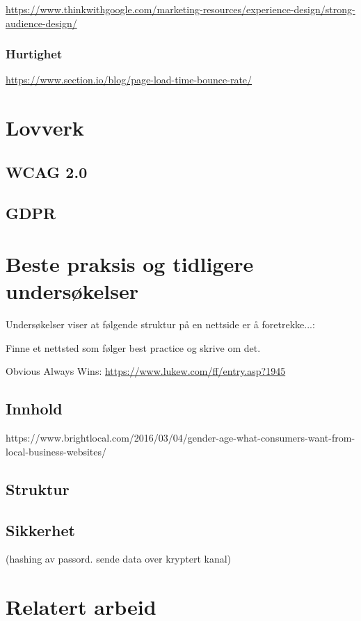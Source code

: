 \url{https://www.thinkwithgoogle.com/marketing-resources/experience-design/strong-audience-design/}

\subsubsection{Hurtighet}
\url{https://www.section.io/blog/page-load-time-bounce-rate/ }


\section{Lovverk}
\subsection{WCAG 2.0}
\subsection{GDPR}



\section{Beste praksis og tidligere undersøkelser}
Undersøkelser viser at følgende struktur på en nettside er å foretrekke...:

Finne et nettsted som følger best practice og skrive om det.

Obvious Always Wins:
\url{https://www.lukew.com/ff/entry.asp?1945}

\subsection{Innhold}
https://www.brightlocal.com/2016/03/04/gender-age-what-consumers-want-from-local-business-websites/ 
\subsection{Struktur}

\subsection{Sikkerhet}
 (hashing av passord. sende data over kryptert kanal)

\section{Relatert arbeid}

